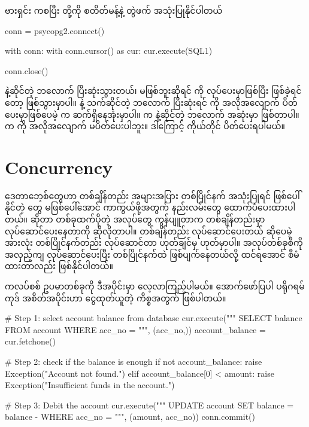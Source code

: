 \begin{mytcboxflt}
 ဗားရှင်း  ကစပြီး  တို့ကို  စတိတ်မန့်နဲ့ တွဲဖက် အသုံးပြုနိုင်ပါတယ်
%
\begin{pytc}
conn = psycopg2.connect()

with conn:
    with conn.cursor() as cur:
        cur.execute(SQL1)

conn.close()
\end{pytc}
 နဲ့ဆိုင်တဲ့  ဘလောက်  ပြီးဆုံးသွားတယ်၊  မဖြစ်ဘူးဆိုရင်  ကို   လုပ်ပေးမှာဖြစ်ပြီး  ဖြစ်ခဲ့ရင်တော့  ဖြစ်သွားမှာပါ။  နဲ့ သက်ဆိုင်တဲ့  ဘလောက်  ပြီးဆုံးရင်  ကို အလိုအလျောက် ပိတ်ပေးမှာဖြစ်ပေမဲ့  က ဆက်ရှိနေအုံးမှာပါ။  က  နဲ့ဆိုင်တဲ့  ဘလောက် အဆုံးမှာ ဖြစ်တာပါ။  က  ကို အလိုအလျောက် မပိတ်ပေးပါဘူး။ ဒါကြောင့် ကိုယ်တိုင် ပိတ်ပေးရပါမယ်။
\end{mytcboxflt}

\section{Concurrency}
ဒေတာဘေ့စ်တွေဟာ တစ်ချိန်တည်း  အများအပြား တစ်ပြိုင်နက် အသုံးပြုရင် ဖြစ်ပေါ်နိုင်တဲ့  တွေ မဖြစ်ပေါ်အောင် ကာကွယ်ဖို့အတွက် နည်းလမ်းတွေ ထောက်ပံပေးထားပါတယ်။  ဆိုတာ တစ်ခုထက်ပိုတဲ့ အလုပ်တွေ ကွန်ပျူတာက တစ်ချိန်တည်းမှာ လုပ်ဆောင်ပေးနေတာကို ဆိုလိုတာပါ။ တစ်ချိန်တည်း လုပ်ဆောင်ပေးတယ် ဆိုပေမဲ့ အားလုံး တစ်ပြိုင်နက်တည်း လုပ်ဆောင်တာ ဟုတ်ချင်မှ ဟုတ်မှာပါ။ အလုပ်တစ်ခုစီကို အလှည့်ကျ လုပ်ဆောင်ပေးပြီး တစ်ပြိုင်နက်ထဲ ဖြစ်ပျက်နေတယ်လို့ ထင်ရအောင် စီမံထားတာလည်း ဖြစ်နိုင်ပါတယ်။ 

ကလပ်စစ်  ဥပမာတစ်ခုကို ဒီအပိုင်းမှာ လေ့လာကြည့်ပါမယ်။ အောက်ဖော်ပြပါ ပရိုဂရမ်ကုဒ် အစိတ်အပိုင်းဟာ ငွေထုတ်ယူတဲ့ ကိစ္စအတွက် ဖြစ်ပါတယ်။
%
\begin{py}
# Step 1: select account balance from database
cur.execute("""
    SELECT balance FROM account WHERE acc_no = %
""", (acc_no,))
account_balance = cur.fetchone()

# Step 2: check if the balance is enough
if not account_balance:
    raise Exception("Account not found.")
elif account_balance[0] < amount:
    raise Exception("Insufficient funds in the account.")

# Step 3: Debit the account
cur.execute("""
    UPDATE account
    SET balance = balance - %
    WHERE acc_no = %
""", (amount, acc_no))
conn.commit()
\end{py}
%

